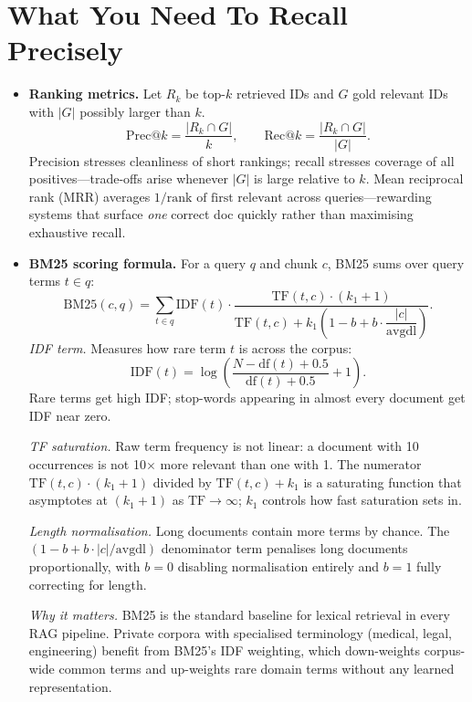 \section*{What You Need To Recall Precisely}
\begin{itemize}[leftmargin=1.5em]
  \item \textbf{Ranking metrics.}
  Let \(R_k\) be top-$k$ retrieved IDs and \(G\) gold relevant IDs with $|G|$ possibly larger than $k$.
  \[
    \mathrm{Prec@}k=\frac{|R_k \cap G|}{k},\qquad
    \mathrm{Rec@}k=\frac{|R_k \cap G|}{|G|}.
  \]
  Precision stresses cleanliness of short rankings; recall stresses coverage of all positives---trade-offs arise whenever $|G|$ is large relative to $k$. Mean reciprocal rank (MRR) averages \(1/\text{rank of first relevant}\) across queries---rewarding systems that surface \emph{one} correct doc quickly rather than maximising exhaustive recall.
  \item \textbf{BM25 scoring formula.}
  For a query $q$ and chunk $c$, BM25 sums over query terms $t \in q$:
  \[
    \mathrm{BM25}(c,q) = \sum_{t\in q}
      \mathrm{IDF}(t)\cdot
      \frac{\mathrm{TF}(t,c)\cdot(k_1+1)}
           {\mathrm{TF}(t,c) + k_1\!\left(1-b+b\cdot\dfrac{|c|}{\mathrm{avgdl}}\right)}.
  \]
  \emph{IDF term.} Measures how rare term $t$ is across the corpus:
  \[
    \mathrm{IDF}(t) = \log\!\left(\frac{N - \mathrm{df}(t) + 0.5}{\mathrm{df}(t) + 0.5}+1\right).
  \]
  Rare terms get high IDF; stop-words appearing in almost every document get IDF near zero.

  \emph{TF saturation.} Raw term frequency is not linear: a document with 10 occurrences is not 10$\times$ more relevant than one with 1. The numerator $\mathrm{TF}(t,c)\cdot(k_1+1)$ divided by $\mathrm{TF}(t,c)+k_1$ is a saturating function that asymptotes at $(k_1+1)$ as $\mathrm{TF}\to\infty$; $k_1$ controls how fast saturation sets in.

  \emph{Length normalisation.} Long documents contain more terms by chance. The $(1-b+b\cdot|c|/\mathrm{avgdl})$ denominator term penalises long documents proportionally, with $b=0$ disabling normalisation entirely and $b=1$ fully correcting for length.

  \emph{Why it matters.} BM25 is the standard baseline for lexical retrieval in every RAG pipeline. Private corpora with specialised terminology (medical, legal, engineering) benefit from BM25's IDF weighting, which down-weights corpus-wide common terms and up-weights rare domain terms without any learned representation.


\end{itemize}
